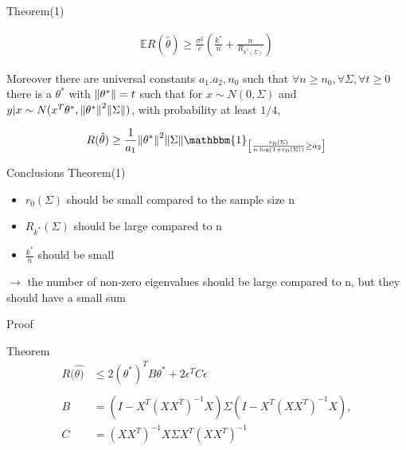 \documentclass{beamer}
\begin{document}
\begin{frame}{Theorem(1)}

\begin{align*}
	\mathbb{E}R(\hat{\theta}) \geq \frac{\sigma^2}{c} \left(\frac{k^*}{n} + \frac{n}{R_{k^*(\Sigma)}}\right)
\end{align*}


Moreover there are universal constants $a_1.a_2,n_0$ such that $\forall n \geq n_0, \forall \Sigma, \forall t \geq 0$ there is a $\theta^*$ with $\norm{\theta^*} = t$ such that for $x \sim N(0,\Sigma)$ and $y|x \sim N(x^T\theta^*,\norm{\theta^*}^2\norm{\Sigma})$, with probability at least $1/4$,
	

\begin{align*}
	R(\hat{\theta})\geq \frac{1}{a_1}\norm{\theta^*}^2\norm{\Sigma}\mathbbm{1}_{\left[\frac{r_0(\Sigma)}{n\log(1+r_0(\Sigma))} \geq a_2\right]}
\end{align*}

\end{frame}

\begin{frame}{Conclusions Theorem(1)}
\begin{itemize}
\item $r_0(\Sigma)$ should be small compared to the sample size n
\item $R_{k^*}(\Sigma)$ should be large compared to n
\item $\frac{k^*}{n}$ should be small
\end{itemize}
\vspace*{0.5 cm}

$\rightarrow $ the number of non-zero eigenvalues should be large compared \hspace*{0.4 cm} to n, but they should have a small sum

\end{frame}


\begin{frame}{Proof}

\begin{center}
\begin{block}{Theorem}
	\begin{align*}
	R(\hat{\theta)} & \leq 2(\theta^*)^TB\theta^* + 2\epsilon^TC\epsilon\\\\
	B & = (I - X^T(XX^T)^{-1}X)\Sigma(I - X^T(XX^T)^{-1}X),  \\
	C & = (XX^T)^{-1}X\Sigma X^T(XX^T)^{-1}
	\end{align*}
\end{block}
\end{center}
\end{frame}
\end{document}
